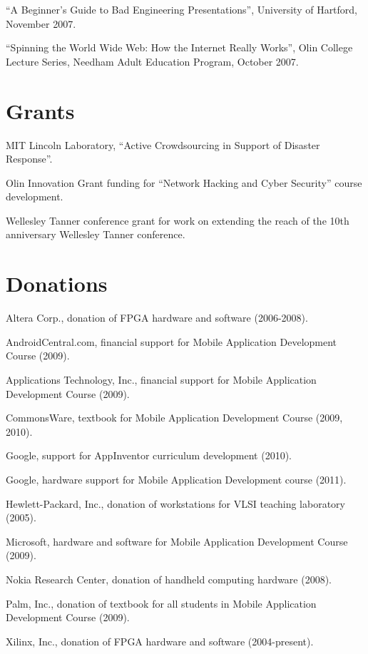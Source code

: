 \documentclass[line]{res}
\begin{document}
\begin{resume}
	``A Beginner's Guide to Bad Engineering Presentations'', University of Hartford, November 2007.
	
	``Spinning the World Wide Web: How the Internet Really Works'', Olin College Lecture Series, Needham Adult Education Program, October 2007.
	
	\section{\sc Grants}
	MIT Lincoln Laboratory, ``Active Crowdsourcing in Support of Disaster Response''.
	
	Olin Innovation Grant funding for ``Network Hacking and Cyber Security'' course development.
	
	Wellesley Tanner conference grant for work on extending the reach of the 10th anniversary Wellesley Tanner conference.
	
	\section{\sc Donations}
	
	Altera Corp., donation of FPGA hardware and software (2006-2008).
	
	AndroidCentral.com, financial support for Mobile Application Development Course (2009).
	
	Applications Technology, Inc., financial support for Mobile Application Development Course (2009).
	
	CommonsWare, textbook for Mobile Application Development Course (2009, 2010).
	
	Google, support for AppInventor curriculum development (2010).
	
	Google, hardware support for Mobile Application Development course (2011).
	
	Hewlett-Packard, Inc., donation of workstations for VLSI teaching laboratory (2005).
	
	Microsoft, hardware and software for Mobile Application Development Course (2009).
	
	Nokia Research Center, donation of handheld computing hardware (2008).
	
	Palm, Inc., donation of textbook for all students in Mobile Application Development Course (2009).
	
	Xilinx, Inc., donation of FPGA hardware and software (2004-present).
	

\end{resume}
\end{document}
